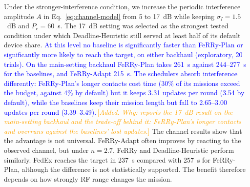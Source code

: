 \documentclass[conference]{IEEEtran}
\newcommand{\sysname}{FeRRy}
\newcommand{\changenote}[1]{\textcolor{orange}{\,[\emph{#1}]}}
\begin{document}
Under the stronger-interference condition, we increase the periodic interference
amplitude \(A\) in Eq.~\eqref{eq:channel-model} from 5 to 17~dB while keeping
\(\sigma_I=1.5\)~dB and \(P_c=60\)~s. The 17~dB setting was selected as the
strongest tested condition under which Deadline-Heuristic still served at
least half of its default device share. \textcolor{blue}{At this level no
baseline is significantly faster than \sysname{}-Plan or significantly more likely
to reach the target, on either backhaul (exploratory, 20 trials). On the
main-setting backhaul \sysname{}-Plan takes 261~s against 244--277~s for the
baselines, and \sysname{}-Adapt 215~s. The schedulers absorb interference
differently: \sysname{}-Plan's longer contacts cost time (30\% of its missions
exceed the budget, against 4\% by default) but it keeps 3.31 updates per round
(3.54 by default), while the baselines keep their mission length but fall to
2.65--3.00 updates per round (3.39--3.49).}\changenote{Added. Why: reports the 17~dB result on the main-setting backhaul and the trade-off behind it: \sysname{}-Plan's longer contacts and overruns against the baselines' lost updates.} The channel results show that the
advantage is not universal. \sysname{}-Adapt often improves by reacting to the
observed channel, but under \(n=2.7\), \sysname{} and Deadline-Heuristic
perform similarly. FedEx reaches the target in 237~s compared with 257~s for
\sysname{}-Plan, although the difference is not statistically supported. The
benefit therefore depends on how strongly RF range changes the mission.
\end{document}
